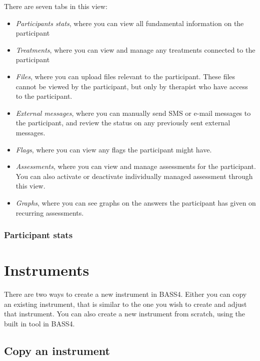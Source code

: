 \documentclass[]{book}
\providecommand{\tightlist}{%
  \setlength{\itemsep}{0pt}\setlength{\parskip}{0pt}}
\begin{document}
There are seven tabs in this view:

\begin{itemize}
\tightlist
\item
  \emph{Participants stats}, where you can view all fundamental information on the participant
\item
  \emph{Treatments}, where you can view and manage any treatments connected to the participant
\item
  \emph{Files}, where you can upload files relevant to the participant. These files cannot be viewed by the participant, but only by therapist who have access to the participant.
\item
  \emph{External messages}, where you can manually send SMS or e-mail messages to the participant, and review the status on any previously sent external messages.
\item
  \emph{Flags}, where you can view any flags the participant might have.
\item
  \emph{Assessments}, where you can view and manage assessments for the participant. You can also activate or deactivate individually managed assessment through this view.
\item
  \emph{Graphs}, where you can see graphs on the answers the participant has given on recurring assessments.
\end{itemize}

\hypertarget{participant-stats}{%
\subsection{Participant stats}\label{participant-stats}}

\hypertarget{instruments}{%
\chapter{Instruments}\label{instruments}}

There are two ways to create a new instrument in BASS4. Either you can copy an existing instrument, that is similar to the one you wish to create and adjust that instrument. You can also create a new instrument from scratch, using the built in tool in BASS4.

\hypertarget{copy-an-instrument}{%
\section{Copy an instrument}\label{copy-an-instrument}}
\end{document}
